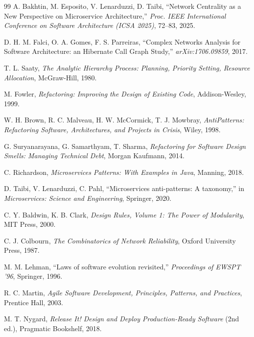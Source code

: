 \documentclass[11pt]{article}
\begin{document}
\begin{thebibliography}{99}
 A. Bakhtin, M. Esposito, V. Lenarduzzi, D. Taibi, ``Network Centrality as a New
  Perspective on Microservice Architecture,'' \emph{Proc. IEEE International Conference on Software
  Architecture (ICSA 2025)}, 72--83, 2025.

 D. H. M. Falci, O. A. Gomes, F. S. Parreiras, ``Complex Networks Analysis for
  Software Architecture: an Hibernate Call Graph Study,'' \emph{arXiv:1706.09859}, 2017.

 T. L. Saaty, \emph{The Analytic Hierarchy Process: Planning, Priority Setting,
  Resource Allocation}, McGraw-Hill, 1980.

 M. Fowler, \emph{Refactoring: Improving the Design of Existing Code},
  Addison-Wesley, 1999.

 W. H. Brown, R. C. Malveau, H. W. McCormick, T. J. Mowbray, \emph{AntiPatterns:
  Refactoring Software, Architectures, and Projects in Crisis}, Wiley, 1998.

 G. Suryanarayana, G. Samarthyam, T. Sharma, \emph{Refactoring for Software
  Design Smells: Managing Technical Debt}, Morgan Kaufmann, 2014.

 C. Richardson, \emph{Microservices Patterns: With Examples in Java}, Manning,
  2018.

 D. Taibi, V. Lenarduzzi, C. Pahl, ``Microservices anti-patterns: A taxonomy,'' in
  \emph{Microservices: Science and Engineering}, Springer, 2020.

 C. Y. Baldwin, K. B. Clark, \emph{Design Rules, Volume 1: The Power of
  Modularity}, MIT Press, 2000.

 C. J. Colbourn, \emph{The Combinatorics of Network Reliability}, Oxford
  University Press, 1987.

 M. M. Lehman, ``Laws of software evolution revisited,'' \emph{Proceedings of
  EWSPT '96}, Springer, 1996.

 R. C. Martin, \emph{Agile Software Development, Principles, Patterns, and
  Practices}, Prentice Hall, 2003.

 M. T. Nygard, \emph{Release It! Design and Deploy Production-Ready Software}
  (2nd ed.), Pragmatic Bookshelf, 2018.

\end{thebibliography}
\end{document}
